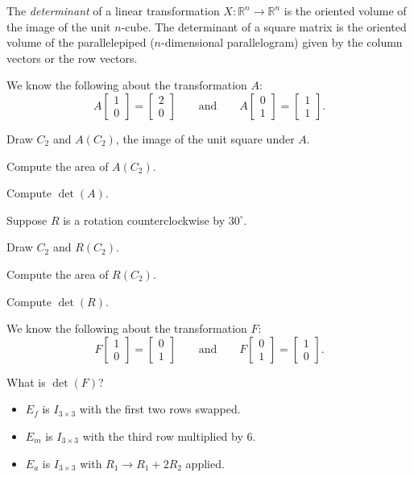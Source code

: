\documentclass{problemset}
\newcommand{\R}{\mathbb{R}}
\newcommand{\mat}[1]{\begin{bmatrix}#1\end{bmatrix}}
\begin{document}
	\begin{definition}[Determinant]
	The \emph{determinant} of a linear transformation $X:\R^n\to \R^n$ is the 
	oriented volume of the image of the unit $n$-cube.  The determinant
	of a square matrix is the oriented volume of the parallelepiped 
	($n$-dimensional parallelogram) given by the column vectors or the row
	vectors.
	\end{definition}

	\question
	We know the following about the transformation $A$:
	\[
		A\mat{1\\0}=\mat{2\\0}\qquad\text{and}\qquad A\mat{0\\1}=\mat{1\\1}.
	\]
	\begin{parts}
	\item Draw $C_2$ and $A(C_2)$, the image of the unit square
			under $A$.
		\item Compute the area of $A (C_2)$.
		\item Compute $\det(A)$.
	\end{parts}

	\question
	Suppose $R$ is a rotation counterclockwise by $30^\circ$.
	\begin{parts}
	\item Draw $C_2$ and $R(C_2)$.
	\item Compute the area of $R(C_2)$.
		\item Compute $\det(R)$.
	\end{parts}
	
	\question
	We know the following about the transformation $F$:
	\[
		F\mat{1\\0}=\mat{0\\1}\qquad\text{and}\qquad F\mat{0\\1}=\mat{1\\0}.
	\]
	\begin{parts}
		\item What is $\det(F)$?
	\end{parts}

	\question
	\begin{itemize}
		\item $E_f$ is $I_{3\times 3}$ with the first two rows swapped.
		\item $E_m$ is $I_{3\times 3}$ with the third row multiplied by 6.
		\item $E_a$ is $I_{3\times 3}$ with $R_1\to R_1+2R_2$ applied.
	\end{itemize}
\end{document}
